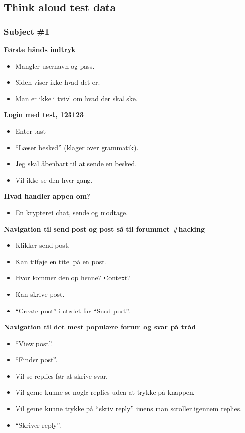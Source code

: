 \subsection{Think aloud test data}

\subsubsection{Subject \#1}

\noindent\textbf{Første hånds indtryk}
\begin{itemize}
    \item Mangler usernavn og pass.
    \item Siden viser ikke hvad det er.
    \item Man er ikke i tvivl om hvad der skal ske.
\end{itemize}

\noindent\textbf{Login med test, 123123}
\begin{itemize}
    \item Enter tast
    \item “Læser besked” (klager over grammatik).
    \item Jeg skal åbenbart til at sende en besked.
    \item Vil ikke se den hver gang.
\end{itemize}

\noindent\textbf{Hvad handler appen om?}
\begin{itemize}
    \item En krypteret chat, sende og modtage.
\end{itemize}

\noindent\textbf{Navigation til send post og post så til forummet \#hacking}
\begin{itemize}
    \item Klikker send post.
    \item Kan tilføje en titel på en post.
    \item Hvor kommer den op henne? Context?
    \item Kan skrive post.
    \item “Create post” i stedet for “Send post”.
\end{itemize}

\noindent\textbf{Navigation til det mest populære forum og svar på tråd}
\begin{itemize}
    \item “View post”.
    \item “Finder post”.
    \item Vil se replies før at skrive svar.
    \item Vil gerne kunne se nogle replies uden at trykke på knappen.
    \item Vil gerne kunne trykke på “skriv reply” imens man scroller igennem replies.
    \item “Skriver reply”.
\end{itemize}

